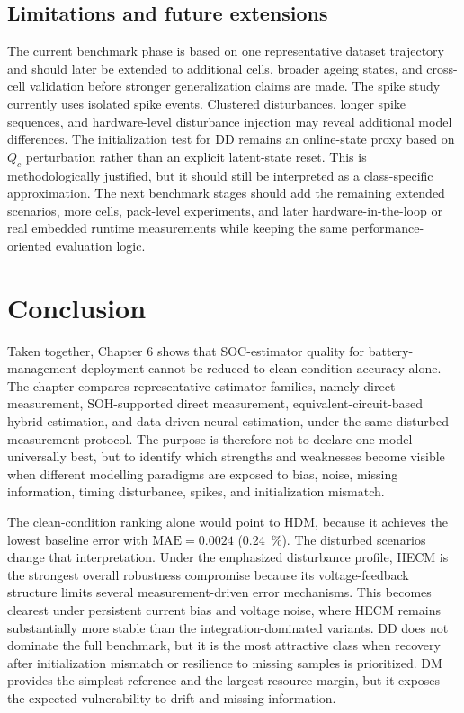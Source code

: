 \documentclass[
    a4paper,
    12pt,
    titlepage,
    bibliography=totoc,
    twoside=on,
    parskip=false,
    numbers=noenddot,
    cleardoublepage=empty,
    DIV=12,
    BCOR=12.0mm,
    headheight=36pt,
    headings=openright
]{scrreprt}
\begin{document}
\subsection{Limitations and future extensions}
The current benchmark phase is based on one representative dataset trajectory and should later be extended to additional cells, broader ageing states, and cross-cell validation before stronger generalization claims are made. The spike study currently uses isolated spike events. Clustered disturbances, longer spike sequences, and hardware-level disturbance injection may reveal additional model differences. The initialization test for DD remains an online-state proxy based on $Q_c$ perturbation rather than an explicit latent-state reset. This is methodologically justified, but it should still be interpreted as a class-specific approximation. The next benchmark stages should add the remaining extended scenarios, more cells, pack-level experiments, and later hardware-in-the-loop or real embedded runtime measurements while keeping the same performance-oriented evaluation logic.

\section{Conclusion}
Taken together, Chapter 6 shows that SOC-estimator quality for battery-management deployment cannot be reduced to clean-condition accuracy alone. The chapter compares representative estimator families, namely direct measurement, SOH-supported direct measurement, equivalent-circuit-based hybrid estimation, and data-driven neural estimation, under the same disturbed measurement protocol. The purpose is therefore not to declare one model universally best, but to identify which strengths and weaknesses become visible when different modelling paradigms are exposed to bias, noise, missing information, timing disturbance, spikes, and initialization mismatch.

The clean-condition ranking alone would point to HDM, because it achieves the lowest baseline error with $\mathrm{MAE}=0.0024$ (\SI{0.24}{\percent}). The disturbed scenarios change that interpretation. Under the emphasized disturbance profile, HECM is the strongest overall robustness compromise because its voltage-feedback structure limits several measurement-driven error mechanisms. This becomes clearest under persistent current bias and voltage noise, where HECM remains substantially more stable than the integration-dominated variants. DD does not dominate the full benchmark, but it is the most attractive class when recovery after initialization mismatch or resilience to missing samples is prioritized. DM provides the simplest reference and the largest resource margin, but it exposes the expected vulnerability to drift and missing information.
\end{document}
